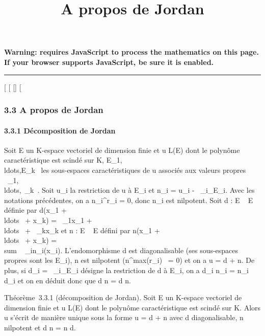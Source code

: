 \documentclass[]{article}
\title{A propos de Jordan}
\author{}
\date{}
\begin{document}
\maketitle

\textbf{Warning: 
requires JavaScript to process the mathematics on this page.\\ If your
browser supports JavaScript, be sure it is enabled.}

\begin{center}\rule{3in}{0.4pt}\end{center}

{[}
{[}
{[}{]}
{[}

\subsubsection{3.3 A propos de Jordan}

\paragraph{3.3.1 Décomposition de Jordan}

Soit E un K-espace vectoriel de dimension finie et u \in L(E) dont le
polynôme caractéristique est scindé sur K,
E\_1,\\ldots,E\_k~
les sous-espaces caractéristiques de u associés aux valeurs propres
\lambda~\_1,\\ldots,\lambda~\_k~.
Soit u\_i la restriction de u à E\_i et n\_i =
u\_i -
\lambda~\_i\mathrmId\_E\_i. Avec les
notations précédentes, on a n\_i^r\_i = 0, donc
n\_i est nilpotent. Soit d : E \rightarrow~ E définie par d(x\_1 +
\\ldots~ +
x\_k) = \lambda~\_1x\_1 +
\\ldots~ +
\lambda~\_kx\_k et n : E \rightarrow~ E défini par n(x\_1 +
\\ldots~ +
x\_k) = \\sum ~
\_in\_i(x\_i). L'endomorphisme d est
diagonalisable (ses sous-espaces propres sont les E\_i), n est
nilpotent (n^max(r\_i)~ = 0)
et on a u = d + n. De plus, si d\_i =
\lambda~\_i\mathrmId\_E\_i désigne
la restriction de d à E\_i, on a d\_i \cdot n\_i =
n\_i \cdot d\_i et on en déduit donc que d \cdot n = d \cdot n.

Théorème~3.3.1 (décomposition de Jordan). Soit E un K-espace vectoriel
de dimension finie et u \in L(E) dont le polynôme caractéristique est
scindé sur K. Alors u s'écrit de manière unique sous la forme u = d + n
avec d diagonalisable, n nilpotent et d \cdot n = n \cdot d.
\end{document}
